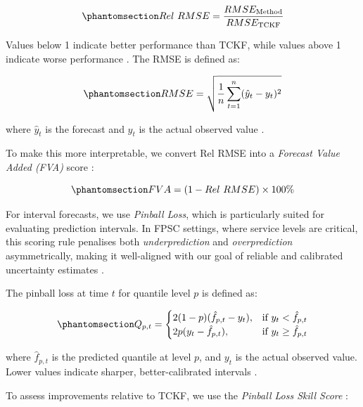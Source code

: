 \documentclass[
  authoryear,
  doubleblind,
  3p]{elsarticle}
\begin{document}
\begin{equation}\phantomsection\label{eq-relrmse}{
Rel\ RMSE = \frac{RMSE_{\text{Method}}}{RMSE_{\text{TCKF}}}
}\end{equation}

Values below 1 indicate better performance than TCKF, while values above
1 indicate worse performance \citep{davydenko2013}. The RMSE is defined
as:

\begin{equation}\phantomsection\label{eq-rmse}{
RMSE = \sqrt{\frac{1}{n} \sum_{t=1}^{n} (\hat{y}_t - y_t)^2}
}\end{equation}

where \(\hat{y}_t\) is the forecast and \(y_t\) is the actual observed
value \citep{hyndman2021forecasting}.

To make this more interpretable, we convert Rel RMSE into a
\emph{Forecast Value Added (FVA)} score \citep{gilliland2008fva}:

\begin{equation}\phantomsection\label{eq-fva_1}{
FVA = (1 - Rel\ RMSE) \times 100\%
}\end{equation}

For interval forecasts, we use \emph{Pinball Loss}, which is
particularly suited for evaluating prediction intervals. In FPSC
settings, where service levels are critical, this scoring rule penalises
both \emph{underprediction} and \emph{overprediction} asymmetrically,
making it well-aligned with our goal of reliable and calibrated
uncertainty estimates \citep{kolassa2023}.

The pinball loss at time \(t\) for quantile level \(p\) is defined as:

\begin{equation}\phantomsection\label{eq-pinball}{
Q_{p,t} =
\begin{cases}
2(1 - p)(\hat{f}_{p,t} - y_t), & \text{if } y_t < \hat{f}_{p,t} \\
2p(y_t - \hat{f}_{p,t}), & \text{if } y_t \geq \hat{f}_{p,t}
\end{cases}
}\end{equation}

where \(\hat{f}_{p,t}\) is the predicted quantile at level \(p\), and
\(y_t\) is the actual observed value. Lower values indicate sharper,
better-calibrated intervals \citep{hyndman2021forecasting}.

To assess improvements relative to TCKF, we use the \emph{Pinball Loss
Skill Score} \citep{hyndman2021forecasting}:
\end{document}
